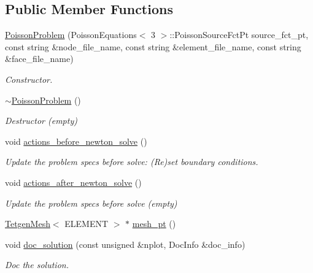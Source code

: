 \subsection*{Public Member Functions}
\begin{DoxyCompactItemize}
\item 
\hyperlink{classPoissonProblem_aef77f2373369411af651d8b6fa955780}{Poisson\+Problem} (Poisson\+Equations$<$ 3 $>$\+::Poisson\+Source\+Fct\+Pt source\+\_\+fct\+\_\+pt, const string \&node\+\_\+file\+\_\+name, const string \&element\+\_\+file\+\_\+name, const string \&face\+\_\+file\+\_\+name)
\begin{DoxyCompactList}\small\item\em Constructor. \end{DoxyCompactList}\item 
\hyperlink{classPoissonProblem_ac247e42d2d292200617f4b9db7ed1ab8}{$\sim$\+Poisson\+Problem} ()
\begin{DoxyCompactList}\small\item\em Destructor (empty) \end{DoxyCompactList}\item 
void \hyperlink{classPoissonProblem_a398608a5ff73b74c5a387b3f794c58df}{actions\+\_\+before\+\_\+newton\+\_\+solve} ()
\begin{DoxyCompactList}\small\item\em Update the problem specs before solve\+: (Re)set boundary conditions. \end{DoxyCompactList}\item 
void \hyperlink{classPoissonProblem_a7a9478d8e1e5c7d3a886b00ab7d50bbd}{actions\+\_\+after\+\_\+newton\+\_\+solve} ()
\begin{DoxyCompactList}\small\item\em Update the problem specs before solve (empty) \end{DoxyCompactList}\item 
\hyperlink{classoomph_1_1TetgenMesh}{Tetgen\+Mesh}$<$ E\+L\+E\+M\+E\+NT $>$ $\ast$ \hyperlink{classPoissonProblem_abeab1d81ed6708e1eb0e9b0833598253}{mesh\+\_\+pt} ()
\item 
void \hyperlink{classPoissonProblem_ab72b17470b4104609b28a64021cb3779}{doc\+\_\+solution} (const unsigned \&nplot, Doc\+Info \&doc\+\_\+info)
\begin{DoxyCompactList}\small\item\em Doc the solution. \end{DoxyCompactList}\end{DoxyCompactItemize}

